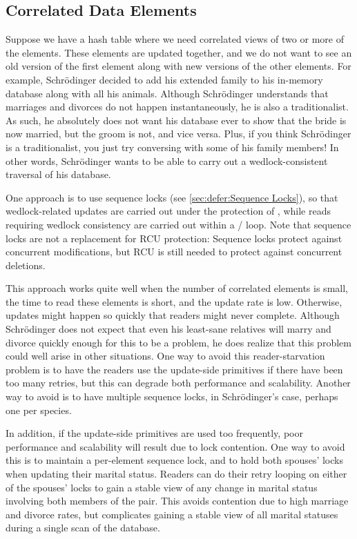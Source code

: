 \subsection{Correlated Data Elements}
\label{sec:together:Correlated Data Elements}

Suppose we have a hash table where we need correlated views of two or
more of the elements.
These elements are updated together, and we do not want to see an old
version of the first element along with new versions of the other
elements.
For example, Schr\"odinger decided to add his extended family to his
in-memory database along with all his animals.
Although Schr\"odinger understands that marriages and divorces do not
happen instantaneously, he is also a traditionalist.
As such, he absolutely does not want his database ever to show that the
bride is now married, but the groom is not, and vice versa.
Plus, if you think Schr\"odinger is a traditionalist, you just
try conversing with some of his family members!
In other words, Schr\"odinger wants to be able to carry out a
wedlock-consistent traversal of his database.

One approach is to use sequence locks
(see \cref{sec:defer:Sequence Locks}),
so that wedlock-related updates are carried out under the
protection of , while reads requiring
wedlock consistency are carried out within
a  /  loop.
Note that sequence locks are not a replacement for RCU protection:
Sequence locks protect against concurrent modifications, but RCU
is still needed to protect against concurrent deletions.

This approach works quite well when the number of correlated elements is
small, the time to read these elements is short, and the update rate is
low.
Otherwise, updates might happen so quickly that readers might never complete.
Although Schr\"odinger does not expect that even his least-sane relatives
will marry and divorce quickly enough for this to be a problem,
he does realize that this problem could well arise in other situations.
One way to avoid this reader-starvation problem is to have the readers
use the update-side primitives if there have been too many retries,
but this can degrade both performance and scalability.
Another way to avoid  is to have multiple sequence locks,
in Schr\"odinger's case, perhaps one per species.

In addition, if the update-side primitives are used too frequently,
poor performance and scalability will result due to lock contention.
One way to avoid this is to maintain a per-element sequence lock,
and to hold both spouses' locks when updating their marital status.
Readers can do their retry looping on either of the spouses' locks
to gain a stable view of any change in marital status involving both
members of the pair.
This avoids contention due to high marriage and divorce rates, but
complicates gaining a stable view of all marital statuses during a
single scan of the database.

